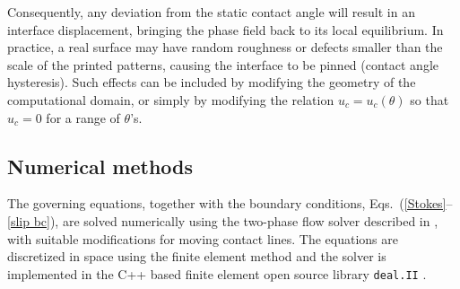 Consequently, any deviation from the static contact angle will result in an interface displacement, bringing the phase field back to its local equilibrium. In practice, a real surface may have random roughness or defects smaller than the scale of the printed patterns, causing the interface to be pinned (\ie contact angle hysteresis). Such effects can be included by modifying the geometry of the computational domain, or simply by modifying the relation $u_c=u_c(\theta)$ so that $u_c=0$ for a range of $\theta$'s. %


\subsection{Numerical methods} \label{numm}

The governing equations, together with the boundary conditions, Eqs.\ (\ref{Stokes}--\ref{slip bc}), are solved numerically using the two-phase flow solver described in \cite{MartinHPC}, with suitable modifications for moving contact lines. The equations are discretized in space using the finite element method and the solver is implemented in the C++ based finite element open source library \texttt{deal.II} \cite{DEAL1, DEAL2}.


